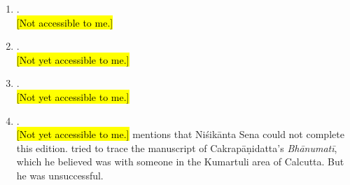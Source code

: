 \documentclass[12pt]{article}
\begin{document}
\begin{enumerate}
	
	\item \textbf{}.\\
	\hl{[Not accessible to me.]}
	
	
	\item \textbf{}.\\
	\hl{[Not yet accessible to me.]}
	
	
	\item \textbf{}.\\
	\hl{[Not yet accessible to me.]}
	
	\item \textbf{}.\\
	\hl{[Not yet accessible to me.]} 
	\textcite[xxviii]{Cattopadhyaya1959} mentions that Niśikānta Sena could not complete this edition. 
	\citeauthor{Cattopadhyaya1959} tried to trace the 
	manuscript of Cakrapāṇidatta's \emph{Bhānumatī}, 
	which he believed was with someone in the Kumartuli area of Calcutta. But he was unsuccessful.
	
	
\end{enumerate}

\printbibliography
\end{document}
